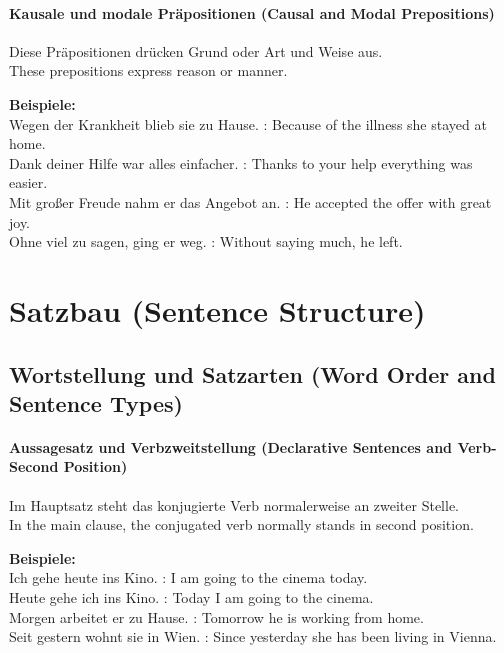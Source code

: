 \documentclass[a4paper]{article}
\begin{document}
        \paragraph{Kausale und modale Präpositionen {\small (Causal and Modal Prepositions)}}
            Diese Präpositionen drücken Grund oder Art und Weise aus.\\
            These prepositions express reason or manner.
            
            \textbf{Beispiele:}\\
            Wegen der Krankheit blieb sie zu Hause. : Because of the illness she stayed at home.\\
            Dank deiner Hilfe war alles einfacher. : Thanks to your help everything was easier.\\
            Mit großer Freude nahm er das Angebot an. : He accepted the offer with great joy.\\
            Ohne viel zu sagen, ging er weg. : Without saying much, he left.
    
    
    \section{Satzbau {\small (Sentence Structure)}}
    
    \subsection{Wortstellung und Satzarten {\small (Word Order and Sentence Types)}}
        
        \paragraph{Aussagesatz und Verbzweitstellung {\small (Declarative Sentences and Verb-Second Position)}}
            Im Hauptsatz steht das konjugierte Verb normalerweise an zweiter Stelle.\\
            In the main clause, the conjugated verb normally stands in second position.
            
            \textbf{Beispiele:}\\
            Ich gehe heute ins Kino. : I am going to the cinema today.\\
            Heute gehe ich ins Kino. : Today I am going to the cinema.\\
            Morgen arbeitet er zu Hause. : Tomorrow he is working from home.\\
            Seit gestern wohnt sie in Wien. : Since yesterday she has been living in Vienna.
        
\end{document}
